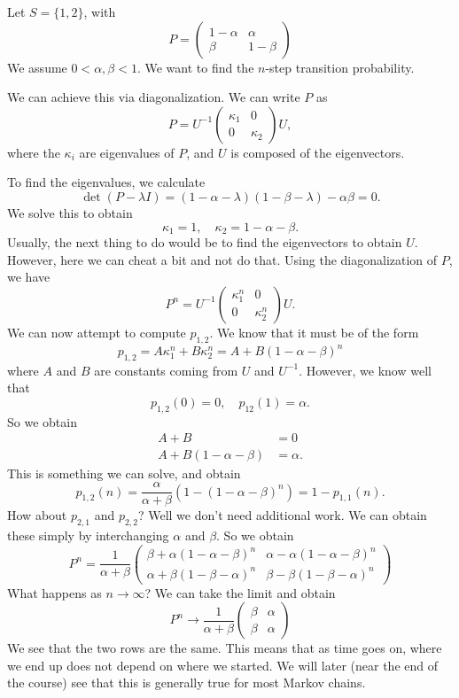 \documentclass[a4paper]{article}
\begin{document}
\begin{eg}
  Let $S = \{1, 2\}$, with
  \[
    P =
    \begin{pmatrix}
      1 - \alpha & \alpha\\
      \beta & 1 - \beta
    \end{pmatrix}
  \]
  We assume $0 < \alpha, \beta < 1$. We want to find the $n$-step transition probability.

  We can achieve this via diagonalization. We can write $P$ as
  \[
    P = U^{-1}
    \begin{pmatrix}
      \kappa_1 & 0\\
      0 & \kappa_2
    \end{pmatrix}U,
  \]
  where the $\kappa_i$ are eigenvalues of $P$, and $U$ is composed of the eigenvectors.

  To find the eigenvalues, we calculate
  \[
    \det (P - \lambda I) = (1 - \alpha - \lambda)(1 - \beta - \lambda) - \alpha\beta = 0.
  \]
  We solve this to obtain
  \[
    \kappa_1 = 1,\quad \kappa_2 = 1 - \alpha - \beta.
  \]
  Usually, the next thing to do would be to find the eigenvectors to obtain $U$. However, here we can cheat a bit and not do that. Using the diagonalization of $P$, we have
  \[
    P^n = U^{-1}
    \begin{pmatrix}
      \kappa_1^n & 0\\
      0 & \kappa_2^n
    \end{pmatrix}U.
  \]
  We can now attempt to compute $p_{1, 2}$. We know that it must be of the form
  \[
    p_{1, 2} = A\kappa_1^n + B\kappa_2^n = A + B(1 - \alpha - \beta)^n
  \]
  where $A$ and $B$ are constants coming from $U$ and $U^{-1}$. However, we know well that
  \[
    p_{1, 2}(0) = 0,\quad p_{12}(1) = \alpha.
  \]
  So we obtain
  \begin{align*}
    A + B &= 0\\
    A + B(1 - \alpha - \beta) &= \alpha.
  \end{align*}
  This is something we can solve, and obtain
  \[
    p_{1, 2}(n) = \frac{\alpha}{\alpha + \beta}(1 - (1 - \alpha - \beta)^n) = 1 - p_{1, 1}(n).
  \]
  How about $p_{2, 1}$ and $p_{2, 2}$? Well we don't need additional work. We can obtain these simply by interchanging $\alpha$ and $\beta$. So we obtain
  \[
    P^n = \frac{1}{\alpha + \beta}
    \begin{pmatrix}
      \beta + \alpha(1 - \alpha - \beta)^n & \alpha - \alpha(1 - \alpha - \beta)^n\\
      \alpha + \beta(1 - \beta - \alpha)^n & \beta - \beta(1 - \beta - \alpha)^n
    \end{pmatrix}
  \]
  What happens as $n\to \infty$? We can take the limit and obtain
  \[
    P^n \to \frac{1}{\alpha + \beta}
    \begin{pmatrix}
      \beta & \alpha\\
      \beta & \alpha
    \end{pmatrix}
  \]
  We see that the two rows are the same. This means that as time goes on, where we end up does not depend on where we started. We will later (near the end of the course) see that this is generally true for most Markov chains.


\end{eg}
\end{document}
